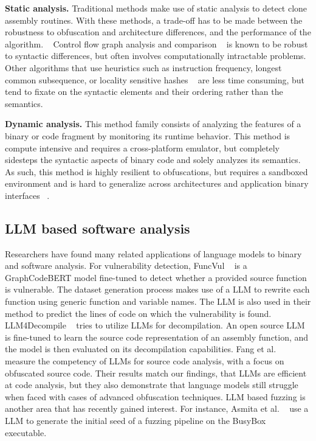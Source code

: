 \textbf{Static analysis.} Traditional methods make use of static analysis to detect clone assembly routines. With these methods, a trade-off has
to be made between the robustness to obfuscation and architecture differences, and the performance of the algorithm. ~\cite{BCSDsurvey}
Control flow graph analysis and comparison ~\cite{BinDiff,graph-bug-search} is known to be robust to syntactic differences, but often
involves computationally intractable problems. Other algorithms that use heuristics such as instruction frequency,
longest common subsequence, or locality sensitive hashes ~\cite{clones.net,op-seq,sem-hash} are less time consuming, but tend to fixate on the syntactic
elements and their ordering rather than the semantics.

\textbf{Dynamic analysis.} This method family consists of analyzing the features of a binary or code fragment by monitoring its runtime behavior.
This method is compute intensive and requires a cross-platform emulator, but completely sidesteps the syntactic aspects of binary code
and solely analyzes its semantics. ~\cite{BCSD} As such, this method is highly resilient to obfuscations, but requires a sandboxed environment
and is hard to generalize across architectures and application binary interfaces ~\cite{blanket-exec}.

\subsection{LLM based software analysis}

Researchers have found many related applications of language models to binary and software analysis.
For vulnerability detection, FuncVul ~\cite{funcVul} is a GraphCodeBERT model fine-tuned to detect whether a provided
source function is vulnerable. The dataset generation process makes use of a LLM to rewrite each function
using generic function and variable names. The LLM is also used in their method to predict the lines of code on which the vulnerability is found.
LLM4Decompile ~\cite{llm4decompile} tries to utilize LLMs for decompilation. An open source LLM is fine-tuned to learn the source code
representation of an assembly function, and the model is then evaluated on its decompilation capabilities. Fang et al. ~\cite{source-analysis}
measure the competency of LLMs for source code analysis, with a focus on obfuscated source code.
Their results match our findings, that LLMs are efficient at code analysis, but they
also demonstrate that language models still struggle when faced with cases of advanced obfuscation techniques.
LLM based fuzzing is another area that has recently gained interest. For instance, Asmita et al. ~\cite{llm-fuzz} use a LLM to
generate the initial seed of a fuzzing pipeline on the BusyBox ~\cite{busybox} executable.

